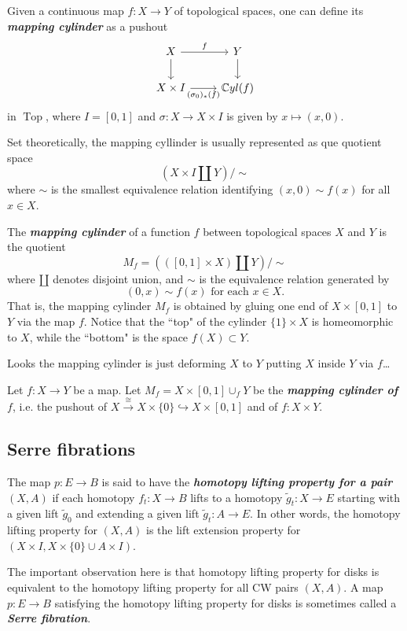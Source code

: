 \begin{defn}
	Given a continuous map $f:X\to Y$ of topological spaces, one can define its \textbf{\textit{mapping cylinder}} as a pushout
	\[\begin{tikzcd}
		X\arrow[r,"f"]\arrow[d]&Y\arrow[d]\\
		X\times I\arrow[r,swap,"(\sigma_0)_*(f)"]&\mathbb{C}yl(f)
	\end{tikzcd}\]
	in $\operatorname{Top}$, where $I=[0,1]$ and $\sigma:X\to X\times I$ is given by $x\mapsto(x,0)$.
	
	Set theoretically, the mapping cyllinder is usually represented as que quotient space
	\[\left(X\times I\coprod Y\right)\Big/\sim\]
	where $\sim$ is the smallest equivalence relation identifying $(x,0)\sim f(x)$ for all $x\in X$.
\end{defn}

\begin{defn}
	The \textbf{\textit{mapping cylinder}} of a function $f$ between topological spaces $X$ and $Y$ is the quotient
	\[M_f=(([0,1]\times X)\amalg Y)\big/\sim\]
	where $\amalg$ denotes disjoint union, and $\sim$ is the equivalence relation generated by
	\[(0,x)\sim f(x)\text{ for each }x\in X.\]
	{\color{persiangreen}That is, the mapping cylinder $M_f$ is obtained by gluing one end of $X\times[0,1]$ to $Y$ via the map $f$.} Notice that the ``top" of the cylinder $\{1\}\times X$ is homeomorphic to $X$, while the ``bottom" is the space $f(X)\subset Y$.
	
{\color{persiangreen}Looks the mapping cylinder is just deforming $X$ to $Y$ putting $X$ inside $Y$ via $f$…}
\end{defn}

\begin{defn}
	Let $f:X\to Y$ be a map. Let $M_f=X\times[0,1]\cup_fY$ be the \textbf{\textit{mapping cylinder of $f$}}, i.e. the pushout of $X\overset{\cong}{\to}X\times\{0\}\hookrightarrow X\times[0,1]$ and of $f:X\times Y$.
\end{defn}

\subsection{Serre fibrations}

\begin{defn}[Hatcher, p. 376]
		The map $p:E\to B$ is said to have the \textbf{\textit{homotopy lifting property for a pair}} $(X,A)$ if each homotopy $f_t:X\to B$ lifts to a homotopy $\tilde{g}_t:X\to E$ starting with a given lift $\tilde{g}_0$ and extending a given lift $\tilde{g}_t:A\to E$. In other words, the homotopy lifting property for $(X,A)$ is the lift extension property for $(X\times I,X\times\{0\}\cup A\times I)$.
	
	The important observation here is that homotopy lifting property for disks is equivalent to the homotopy lifting property for all CW pairs $(X,A)$. A map $p:E\to B$ satisfying the homotopy lifting property for disks is sometimes called a \textbf{\textit{Serre fibration}}.
\end{defn}


